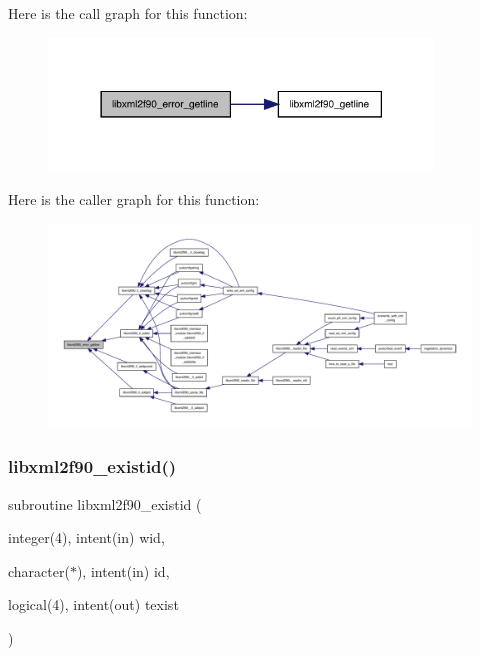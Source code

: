 Here is the call graph for this function\+:
\nopagebreak
\begin{figure}[H]
\begin{center}
\leavevmode
\includegraphics[width=290pt]{libxml2f90_8f90__pp_8f90_ae1a542a061a5705a796b5373b0dcaf1b_cgraph}
\end{center}
\end{figure}
Here is the caller graph for this function\+:
\nopagebreak
\begin{figure}[H]
\begin{center}
\leavevmode
\includegraphics[width=350pt]{libxml2f90_8f90__pp_8f90_ae1a542a061a5705a796b5373b0dcaf1b_icgraph}
\end{center}
\end{figure}
\mbox{\label{libxml2f90_8f90__pp_8f90_aedaeb0ba8d5ce41c39baed261d3f82c5}} 
\subsubsection{\texorpdfstring{libxml2f90\+\_\+existid()}{libxml2f90\_existid()}}
{\footnotesize\ttfamily subroutine libxml2f90\+\_\+existid (\begin{DoxyParamCaption}\item[{integer(4), intent(in)}]{wid,  }\item[{character($\ast$), intent(in)}]{id,  }\item[{logical(4), intent(out)}]{texist }\end{DoxyParamCaption})}

